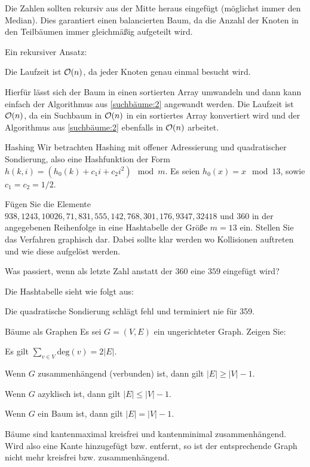 \documentclass{article}
\begin{document}
\begin{solutions}
  \item Die Zahlen sollten rekursiv aus der Mitte heraus eingefügt (möglichst immer den Median). Dies garantiert einen balancierten Baum, da die Anzahl der Knoten in den Teilbäumen immer gleichmäßig aufgeteilt wird.
  \item Ein rekursiver Ansatz:\par
  
  Die Laufzeit ist $\mathcal{O}(n)$, da jeder Knoten genau einmal besucht wird.
  \item Hierfür lässt sich der Baum in einen sortierten Array umwandeln und dann kann einfach der Algorithmus aus \ref{suchbäume:2} angewandt werden. Die Laufzeit ist $\mathcal{O}(n)$, da ein Suchbaum in $\mathcal{O}(n)$ in ein sortiertes Array konvertiert wird und der Algorithmus aus \ref{suchbäume:2} ebenfalls in $\mathcal{O}(n)$ arbeitet.
\end{solutions}

\begin{eexercises}{Hashing}{
    Wir betrachten Hashing mit offener Adressierung und quadratischer Sondierung, also eine Hashfunktion der Form $h(k, i) = (h_0(k) + c_1i + c_2i^2) \mod m$. Es seien $h_0(x) = x \mod 13$, sowie $c_1 = c_2 = 1/2$.
  }
  \item Fügen Sie die Elemente $938, 1243, 10026, 71, 831, 555, 142, 768, 301, 176, 9347, 32418$ und $360$ in der angegebenen Reihenfolge in eine Hashtabelle der Größe $m = 13$ ein. Stellen Sie das Verfahren graphisch dar. Dabei sollte klar werden wo Kollisionen auftreten und wie diese aufgelöst werden.
  \item Was passiert, wenn als letzte Zahl anstatt der $360$ eine $359$ eingefügt wird?
\end{eexercises}

\begin{solutions}
  \item Die Hashtabelle sieht wie folgt aus:\par
  
  \item Die quadratische Sondierung schlägt fehl und terminiert nie für 359.
\end{solutions}

\begin{eexercises}{Bäume als Graphen}{
    Es sei $G = (V, E)$ ein ungerichteter Graph. Zeigen Sie:
  }
  \item Es gilt $\sum_{v \in V} \text{deg}(v) = 2|E|$.
  \item Wenn $G$ zusammenhängend (verbunden) ist, dann gilt $|E| \geq |V| - 1$.
  \item Wenn $G$ azyklisch ist, dann gilt $|E| \leq |V| - 1$.
  \item Wenn $G$ ein Baum ist, dann gilt $|E| = |V| - 1$.
  \item Bäume sind kantenmaximal kreisfrei und kantenminimal zusammenhängend. Wird also eine Kante hinzugefügt bzw. entfernt, so ist der entsprechende Graph nicht mehr kreisfrei bzw. zusammenhängend.
\end{eexercises}
\end{document}
